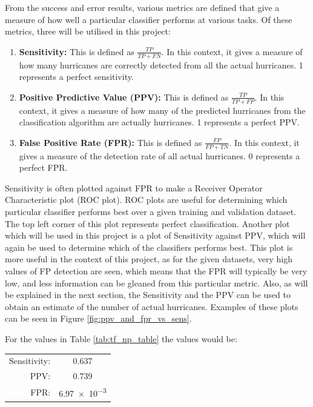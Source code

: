 \documentclass[pdftex,12pt,a4paper]{report}
\begin{document}
From the success and error results, various metrics are defined that give a measure of how well a
particular classifier performs at various tasks. Of these metrics, three will be utilised in this
project:

\begin{enumerate}
    \item \textbf{Sensitivity:} This is defined as $\frac{TP}{TP + FN}$. In this context, it gives a
        measure of how many hurricanes are correctly detected from all the actual hurricanes. 1
        represents a perfect sensitivity.
    \item \textbf{Positive Predictive Value (PPV):} This is defined as $\frac{TP}{TP + FP}$. In this
        context, it gives a measure of how many of the predicted hurricanes from the classification
        algorithm are actually hurricanes. 1 represents a perfect PPV.
    \item \textbf{False Positive Rate (FPR):} This is defined as $\frac{FP}{FP + TN}$. In this
        context, it gives a measure of the detection rate of all actual hurricanes. 0 represents a
        perfect FPR.
\end{enumerate}

Sensitivity is often plotted against FPR to make a Receiver Operator Characteristic plot (ROC plot).
ROC plots are useful for determining which particular classifier performs best over a given training
and validation dataset. The top left corner of this plot represents perfect classification. Another
plot which will be used in this project is a plot of Sensitivity against PPV, which will again
be used to determine which of the classifiers performs best. This plot is more useful in the context
of this project, as for the given datasets, very high values of FP detection are seen, which means
that the FPR will typically be very low, and less information can be gleaned from this particular
metric. Also, as will be explained in the next section, the Sensitivity and the PPV can be used to
obtain an estimate of the number of actual hurricanes. Examples of these plots can be seen in
Figure \ref{fig:ppv_and_fpr_vs_sens}.

For the values in Table \ref{tab:tf_np_table} the values would be:

\begin{table}[hb!]
    \centering
    \begin{tabular}{ r c }
        Sensitivity: & \SI{0.637}{} \\
        PPV: & \SI{0.739}{} \\
        FPR: & \SI{6.97e-3}{} \\
    \end{tabular}
    \label{tab:success_metric_table}
\end{table}
\end{document}
